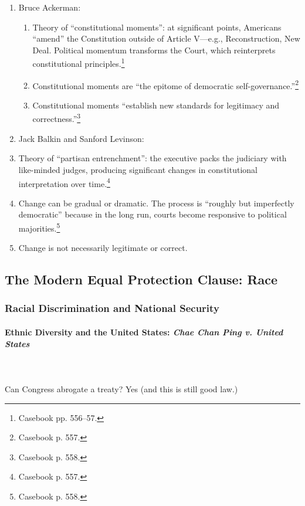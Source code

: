 \begin{enumerate}
    \item Bruce Ackerman:
    \begin{enumerate}
        \item Theory of ``constitutional moments'': at significant points, 
        Americans ``amend'' the Constitution outside of Article V---e.g., 
        Reconstruction, New Deal. Political momentum transforms the Court, 
        which reinterprets constitutional principles.\footnote{Casebook pp. 
        556--57.}
        \item Constitutional moments are ``the epitome of democratic 
        self-governance.''\footnote{Casebook p. 557.}
        \item Constitutional moments ``establish new standards for legitimacy 
        and correctness.''\footnote{Casebook p. 558.}
    \end{enumerate}
    \item Jack Balkin and Sanford Levinson:
        \item Theory of ``partisan entrenchment'': the executive packs the 
        judiciary with like-minded judges, producing significant changes in 
        constitutional interpretation over time.\footnote{Casebook p. 557.}
        \item Change can be gradual or dramatic. The process is ``roughly but 
        imperfectly democratic'' because in the long run, courts become 
        responsive to political majorities.\footnote{Casebook p. 558.}
        \item Change is not necessarily legitimate or correct.
\end{enumerate}


\subsection{The Modern Equal Protection Clause: Race}

\subsubsection{Racial Discrimination and National Security}

\paragraph{Ethnic Diversity and the United States: \emph{Chae Chan Ping v. 
United States}}
~\\\\
Can Congress abrogate a treaty? Yes (and this is still good law.)

